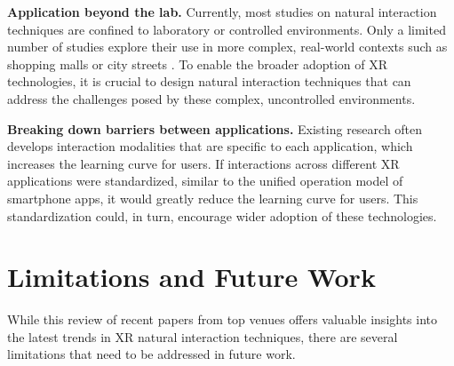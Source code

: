 \documentclass[review]{fcs}
\begin{document}
\textbf{Application beyond the lab.} Currently, most studies on natural interaction techniques are confined to laboratory or controlled environments. Only a limited number of studies explore their use in more complex, real-world contexts such as shopping malls or city streets \cite{DBLP:conf/chi/0005WBCRF24, 10.1145/3613904.3642068}. To enable the broader adoption of XR technologies, it is crucial to design natural interaction techniques that can address the challenges posed by these complex, uncontrolled environments.

\textbf{Breaking down barriers between applications.} Existing research often develops interaction modalities that are specific to each application, which increases the learning curve for users. If interactions across different XR applications were standardized, similar to the unified operation model of smartphone apps, it would greatly reduce the learning curve for users. This standardization could, in turn, encourage wider adoption of these technologies.




















\section{Limitations and Future Work}
While this review of recent papers from top venues offers valuable insights into the latest trends in XR natural interaction techniques, there are several limitations that need to be addressed in future work.
\end{document}
